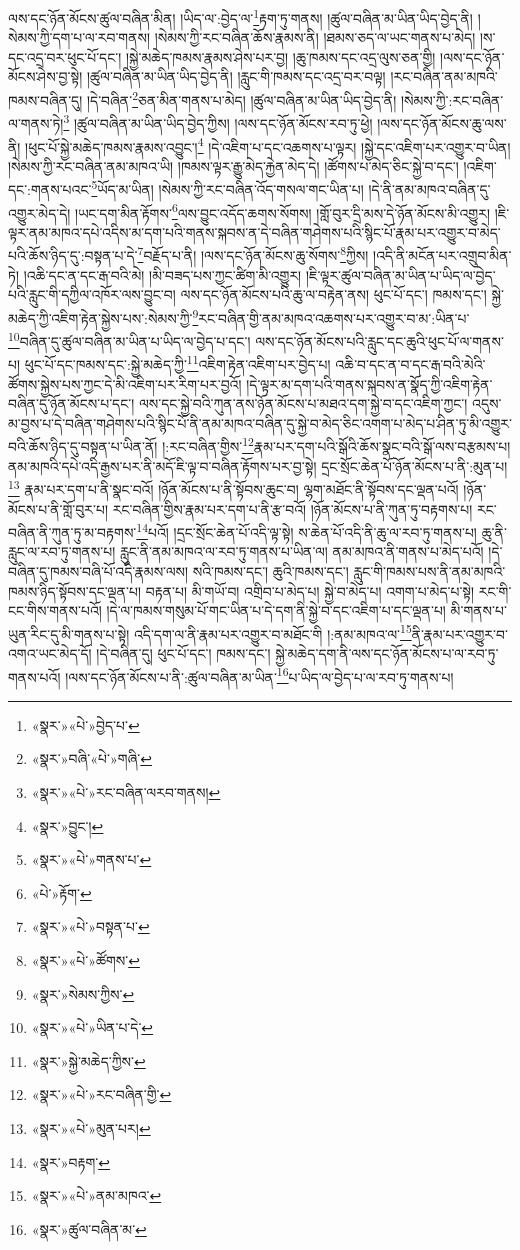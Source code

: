 ལས་དང་ཉོན་མོངས་ཚུལ་བཞིན་མིན། །ཡིད་ལ་:བྱེད་ལ་\footnote{«སྣར་»«པེ་»བྱེད་པ་}རྟག་ཏུ་གནས། །ཚུལ་བཞིན་མ་ཡིན་ཡིད་བྱེད་ནི། །སེམས་ཀྱི་དག་པ་ལ་རབ་གནས། །སེམས་ཀྱི་རང་བཞིན་ཆོས་རྣམས་ནི། །ཐམས་ཅད་ལ་ཡང་གནས་པ་མེད། །ས་དང་འདྲ་བར་ཕུང་པོ་དང་། །སྐྱེ་མཆེད་ཁམས་རྣམས་ཤེས་པར་བྱ། །ཆུ་ཁམས་དང་འདྲ་ལུས་ཅན་གྱི། །ལས་དང་ཉོན་མོངས་ཤེས་བྱ་སྟེ། །ཚུལ་བཞིན་མ་ཡིན་ཡིད་བྱེད་ནི། །རླུང་གི་ཁམས་དང་འདྲ་བར་བལྟ། །རང་བཞིན་ནམ་མཁའི་ཁམས་བཞིན་དུ། །དེ་བཞིན་\footnote{«སྣར་»བཞི་«པེ་»གཞི་}ཅན་མིན་གནས་པ་མེད། །ཚུལ་བཞིན་མ་ཡིན་ཡིད་བྱེད་ནི། །སེམས་ཀྱི་:རང་བཞིན་ལ་གནས་ཏེ།\footnote{«སྣར་»«པེ་»རང་བཞིན་ལརབ་གནས།} །ཚུལ་བཞིན་མ་ཡིན་ཡིད་བྱེད་ཀྱིས། །ལས་དང་ཉོན་མོངས་རབ་ཏུ་ཕྱེ། །ལས་དང་ཉོན་མོངས་ཆུ་ལས་ནི། །ཕུང་པོ་སྐྱེ་མཆེད་ཁམས་རྣམས་འབྱུང་།\footnote{«སྣར་»བྱུང་།} །དེ་འཇིག་པ་དང་འཆགས་པ་ལྟར། །སྐྱེ་དང་འཇིག་པར་འགྱུར་བ་ཡིན། །སེམས་ཀྱི་རང་བཞིན་ནམ་མཁའ་ཡི། །ཁམས་ལྟར་རྒྱུ་མེད་རྐྱེན་མེད་དེ། །ཚོགས་པ་མེད་ཅིང་སྐྱེ་བ་དང་། །འཇིག་དང་:གནས་པའང་\footnote{«སྣར་»«པེ་»གནས་པ་}ཡོད་མ་ཡིན། །སེམས་ཀྱི་རང་བཞིན་འོད་གསལ་གང་ཡིན་པ། །དེ་ནི་ནམ་མཁའ་བཞིན་དུ་འགྱུར་མེད་དེ། །ཡང་དག་མིན་རྟོགས་\footnote{«པེ་»རྟོག་}ལས་བྱུང་འདོད་ཆགས་སོགས། །གློ་བུར་དྲི་མས་དེ་ཉོན་མོངས་མི་འགྱུར། །ཇི་ལྟར་ནམ་མཁའ་དཔེ་འདིས་མ་དག་པའི་གནས་སྐབས་ན་དེ་བཞིན་གཤེགས་པའི་སྙིང་པོ་རྣམ་པར་འགྱུར་བ་མེད་པའི་ཆོས་ཉིད་དུ་:བསྟན་པ་དེ་\footnote{«སྣར་»«པེ་»བསྟན་པ་}བརྗོད་པ་ནི། །ལས་དང་ཉོན་མོངས་ཆུ་སོགས་\footnote{«སྣར་»«པེ་»ཚོགས་}ཀྱིས། །འདི་ནི་མངོན་པར་འགྲུབ་མིན་ཏེ། །འཆི་དང་ན་དང་རྒ་བའི་མེ། །མི་བཟད་པས་ཀྱང་ཚིག་མི་འགྱུར། །ཇི་ལྟར་ཚུལ་བཞིན་མ་ཡིན་པ་ཡིད་ལ་བྱེད་པའི་རླུང་གི་དཀྱིལ་འཁོར་ལས་བྱུང་བ། ལས་དང་ཉོན་མོངས་པའི་ཆུ་ལ་བརྟེན་ནས། ཕུང་པོ་དང་། ཁམས་དང་། སྐྱེ་མཆེད་ཀྱི་འཇིག་རྟེན་སྐྱེས་པས་:སེམས་ཀྱི་\footnote{«སྣར་»སེམས་ཀྱིས་}རང་བཞིན་གྱི་ནམ་མཁའ་འཆགས་པར་འགྱུར་བ་མ་:ཡིན་པ་\footnote{«སྣར་»«པེ་»ཡིན་པ་དེ་}བཞིན་དུ་ཚུལ་བཞིན་མ་ཡིན་པ་ཡིད་ལ་བྱེད་པ་དང་། ལས་དང་ཉོན་མོངས་པའི་རླུང་དང་ཆུའི་ཕུང་པོ་ལ་གནས་པ། ཕུང་པོ་དང་ཁམས་དང་:སྐྱེ་མཆེད་ཀྱི་\footnote{«སྣར་»སྐྱེ་མཆེད་ཀྱིས་}འཇིག་རྟེན་འཇིག་པར་བྱེད་པ། འཆི་བ་དང་ན་བ་དང་རྒ་བའི་མེའི་ཚོགས་སྐྱེས་པས་ཀྱང་དེ་མི་འཇིག་པར་རིག་པར་བྱའོ། །དེ་ལྟར་མ་དག་པའི་གནས་སྐབས་ན་སྣོད་ཀྱི་འཇིག་རྟེན་བཞིན་དུ་ཉོན་མོངས་པ་དང་། ལས་དང་སྐྱེ་བའི་ཀུན་ནས་ཉོན་མོངས་པ་མཐའ་དག་སྐྱེ་བ་དང་འཇིག་ཀྱང་། འདུས་མ་བྱས་པ་དེ་བཞིན་གཤེགས་པའི་སྙིང་པོ་ནི་ནམ་མཁའ་བཞིན་དུ་སྐྱེ་བ་མེད་ཅིང་འགག་པ་མེད་པ་ཤིན་ཏུ་མི་འགྱུར་བའི་ཆོས་ཉིད་དུ་བསྟན་པ་ཡིན་ནོ། །:རང་བཞིན་གྱིས་\footnote{«སྣར་»«པེ་»རང་བཞིན་གྱི་}རྣམ་པར་དག་པའི་སྒོའི་ཆོས་སྣང་བའི་སྒོ་ལས་བརྩམས་པ། ནམ་མཁའི་དཔེ་འདི་རྒྱས་པར་ནི་མདོ་ཇི་ལྟ་བ་བཞིན་རྟོགས་པར་བྱ་སྟེ། དྲང་སྲོང་ཆེན་པོ་ཉོན་མོངས་པ་ནི་:མུན་པ།\footnote{«སྣར་»«པེ་»མུན་པར།} རྣམ་པར་དག་པ་ནི་སྣང་བའོ། །ཉོན་མོངས་པ་ནི་སྟོབས་ཆུང་བ། ལྷག་མཐོང་ནི་སྟོབས་དང་ལྡན་པའོ། །ཉོན་མོངས་པ་ནི་གློ་བུར་པ། རང་བཞིན་གྱིས་རྣམ་པར་དག་པ་ནི་རྩ་བའོ། །ཉོན་མོངས་པ་ནི་ཀུན་ཏུ་བརྟགས་པ། རང་བཞིན་ནི་ཀུན་ཏུ་མ་བརྟགས་\footnote{«སྣར་»བརྟག་}པའོ། །དྲང་སྲོང་ཆེན་པོ་འདི་ལྟ་སྟེ། ས་ཆེན་པོ་འདི་ནི་ཆུ་ལ་རབ་ཏུ་གནས་པ། ཆུ་ནི་རླུང་ལ་རབ་ཏུ་གནས་པ། རླུང་ནི་ནམ་མཁའ་ལ་རབ་ཏུ་གནས་པ་ཡིན་ལ། ནམ་མཁའ་ནི་གནས་པ་མེད་པའོ། །དེ་བཞིན་དུ་ཁམས་བཞི་པོ་འདི་རྣམས་ལས། སའི་ཁམས་དང་། ཆུའི་ཁམས་དང་། རླུང་གི་ཁམས་པས་ནི་ནམ་མཁའི་ཁམས་ཉིད་སྟོབས་དང་ལྡན་པ། བརྟན་པ། མི་གཡོ་བ། འགྲིབ་པ་མེད་པ། སྐྱེ་བ་མེད་པ། འགག་པ་མེད་པ་སྟེ། རང་གི་ངང་གིས་གནས་པའོ། །དེ་ལ་ཁམས་གསུམ་པོ་གང་ཡིན་པ་དེ་དག་ནི་སྐྱེ་བ་དང་འཇིག་པ་དང་ལྡན་པ། མི་གནས་པ་ཡུན་རིང་དུ་མི་གནས་པ་སྟེ། འདི་དག་ལ་ནི་རྣམ་པར་འགྱུར་བ་མཐོང་གི །:ནམ་མཁའ་ལ་\footnote{«སྣར་»«པེ་»ནམ་མཁའ་}ནི་རྣམ་པར་འགྱུར་བ་འགའ་ཡང་མེད་དོ། །དེ་བཞིན་དུ། ཕུང་པོ་དང་། ཁམས་དང་། སྐྱེ་མཆེད་དག་ནི་ལས་དང་ཉོན་མོངས་པ་ལ་རབ་ཏུ་གནས་པའོ། །ལས་དང་ཉོན་མོངས་པ་ནི་:ཚུལ་བཞིན་མ་ཡིན་\footnote{«སྣར་»ཚུལ་བཞིན་མ་}པ་ཡིད་ལ་བྱེད་པ་ལ་རབ་ཏུ་གནས་པ། 
